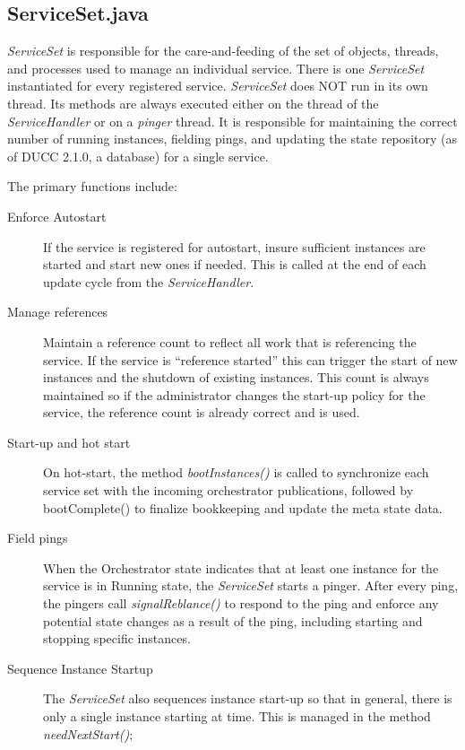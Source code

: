 \subsection{ServiceSet.java}
{\em ServiceSet} is responsible for the care-and-feeding of the set of objects, threads, and
processes used to manage an individual service.  There is one {\em ServiceSet} instantiated for
every registered service.  {\em ServiceSet} does NOT run in its own thread.  Its methods are always
executed either on the thread of the {\em ServiceHandler} or on a {\em pinger} thread. It is
responsible for maintaining the correct number of running instances, fielding pings, and updating
the state repository (as of DUCC 2.1.0, a database) for a single service.

   The primary functions include:
   \begin{description}
     \item[Enforce Autostart]  If the service is registered for autostart, insure sufficient instances are started
       and start new ones if needed.  This is called at the end of each update cycle from the {\em ServiceHandler}.

     \item[Manage references] Maintain a reference count to reflect all work that is
       referencing the service.  If the service is ``reference started'' this can trigger
       the start of new instances and the shutdown of existing instances.  This count is
       always maintained so if the administrator changes the start-up policy for the service,
       the reference count is already correct and is used.

    \item[Start-up and hot start] On hot-start, the method {\em bootInstances()} is called to
      synchronize each service set with the incoming orchestrator publications, followed by
      bootComplete() to finalize bookkeeping and update the meta state data.

    \item[Field pings] When the Orchestrator state indicates that at least one instance for the
      service is in Running state, the {\em ServiceSet} starts a pinger.  After every ping,
      the pingers call {\em signalReblance()} to respond to the ping and enforce any
      potential state changes as a result of the ping, including starting and stopping 
      specific instances.

    \item[Sequence Instance Startup] The {\em ServiceSet} also sequences instance start-up so that
      in general, there is only a single instance starting at  time.  This is managed in the
      method {\em needNextStart()};


\end{description}
